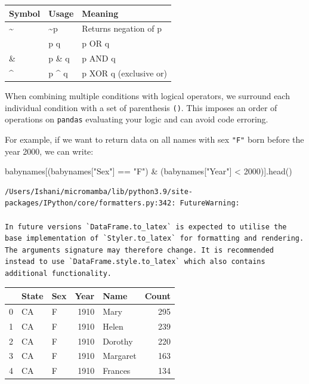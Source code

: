 \documentclass[
  letterpaper,
  DIV=11,
  numbers=noendperiod]{scrreprt}
\newenvironment{Shaded}{\begin{snugshade}}{\end{snugshade}}
\newcommand{\DecValTok}[1]{\textcolor[rgb]{0.68,0.00,0.00}{#1}}
\newcommand{\NormalTok}[1]{\textcolor[rgb]{0.00,0.23,0.31}{#1}}
\newcommand{\OperatorTok}[1]{\textcolor[rgb]{0.37,0.37,0.37}{#1}}
\newcommand{\StringTok}[1]{\textcolor[rgb]{0.13,0.47,0.30}{#1}}
\begin{document}
\begin{longtable}[]{@{}lll@{}}
\toprule\noalign{}
Symbol & Usage & Meaning \\
\midrule\noalign{}
\endhead
\bottomrule\noalign{}
\endlastfoot
\textasciitilde{} & \textasciitilde p & Returns negation of p \\
\textbar{} & p \textbar{} q & p OR q \\
\& & p \& q & p AND q \\
\^{} & p \^{} q & p XOR q (exclusive or) \\
\end{longtable}

When combining multiple conditions with logical operators, we surround
each individual condition with a set of parenthesis \texttt{()}. This
imposes an order of operations on \texttt{pandas} evaluating your logic
and can avoid code erroring.

For example, if we want to return data on all names with sex
\texttt{"F"} born before the year 2000, we can write:

\begin{Shaded}
\begin{Highlighting}[]
\NormalTok{babynames[(babynames[}\StringTok{"Sex"}\NormalTok{] }\OperatorTok{==} \StringTok{"F"}\NormalTok{) }\OperatorTok{\&}\NormalTok{ (babynames[}\StringTok{"Year"}\NormalTok{] }\OperatorTok{\textless{}} \DecValTok{2000}\NormalTok{)].head()}
\end{Highlighting}
\end{Shaded}

\begin{verbatim}
/Users/Ishani/micromamba/lib/python3.9/site-packages/IPython/core/formatters.py:342: FutureWarning:

In future versions `DataFrame.to_latex` is expected to utilise the base implementation of `Styler.to_latex` for formatting and rendering. The arguments signature may therefore change. It is recommended instead to use `DataFrame.style.to_latex` which also contains additional functionality.
\end{verbatim}

\begin{tabular}{lllrlr}
\toprule
{} & State & Sex &  Year &      Name &  Count \\
\midrule
0 &    CA &   F &  1910 &      Mary &    295 \\
1 &    CA &   F &  1910 &     Helen &    239 \\
2 &    CA &   F &  1910 &   Dorothy &    220 \\
3 &    CA &   F &  1910 &  Margaret &    163 \\
4 &    CA &   F &  1910 &   Frances &    134 \\
\bottomrule
\end{tabular}
\end{document}
